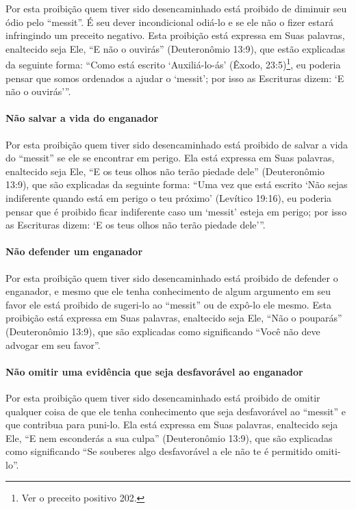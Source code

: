 Por esta proibição quem tiver sido desencaminhado está proibido de
diminuir seu ódio pelo ``messit''. É seu dever incondicional odiá-lo e
se ele não o fizer estará infringindo um preceito negativo. Esta
proibição está expressa em Suas palavras, enaltecido seja Ele, ``E não
o ouvirás'' (Deuteronômio 13:9), que estão explicadas da seguinte forma:
``Como está escrito `Auxiliá-lo-ás' (Êxodo, 23:5)\footnote{Ver o preceito positivo 202.}, eu poderia pensar que somos ordenados a ajudar o `messit'; por isso as Escrituras dizem: `E não o ouvirás'''.

\paragraph{Não salvar a vida do enganador}

Por esta proibição quem tiver sido desencaminhado está proibido de
salvar a vida do ``messit'' se ele se encontrar em perigo. Ela está
expressa em Suas palavras, enaltecido seja Ele, ``E os teus olhos não
terão piedade dele'' (Deuteronômio 13:9), que são explicadas da seguinte
forma: ``Uma vez que está escrito `Não sejas indiferente quando está em
perigo o teu próximo' (Levítico 19:16), eu poderia pensar que é
proibido ficar indiferente caso um `messit' esteja em perigo; por isso
as Escrituras dizem: `E os teus olhos não terão piedade dele'''.

\paragraph{Não defender um enganador}

Por esta proibição quem tiver sido desencaminhado está proibido de
defender o enganador, e mesmo que ele tenha conhecimento de algum
argumento em seu favor ele está proibido de sugeri-lo ao ``messit'' ou
de expô-lo ele mesmo. Esta proibição está expressa em Suas palavras,
enaltecido seja Ele, ``Não o pouparás'' (Deuteronômio 13:9), que são
explicadas como significando ``Você não deve advogar em seu favor''.

\paragraph{Não omitir uma evidência que seja desfavorável ao enganador}

Por esta proibição quem tiver sido desencaminhado está proibido de
omitir qualquer coisa de que ele tenha conhecimento que seja
desfavorável ao ``messit'' e que contribua para puni-lo. Ela está expressa em Suas
palavras, enaltecido seja Ele, ``E nem esconderás a sua culpa''
(Deuteronômio 13:9), que são explicadas como significando ``Se souberes
algo desfavorável a ele não te é permitido omiti-lo''.

